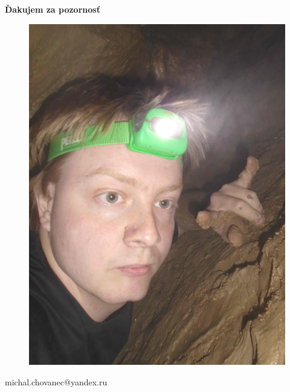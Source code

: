 \documentclass[xcolor=dvipsnames]{beamer}
\begin{document}
\begin{frame}{\bf Ďakujem za pozornosť}

\begin{figure}[ht]
\begin{center}
\begin{minipage}{0.4\linewidth}
\begin{center}
\includegraphics[width=1.0\textwidth]{images/cave.jpg}
\end{center}
\end{minipage}
\end{center}
\end{figure}


\centerline{michal.chovanec@yandex.ru}

\end{frame}
\end{document}
